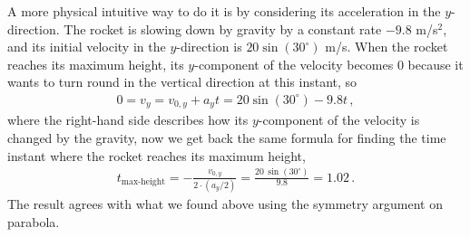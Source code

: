 \documentclass[11pt]{article}
\begin{document}
A more physical intuitive way to do it is by considering its acceleration in the $y$-direction. The rocket is slowing down by gravity by a constant rate $-9.8$ m/s$^2$, and its initial velocity in the $y$-direction is $20\sin(30^\circ)$ m/s. When the rocket reaches its maximum height, its $y$-component of the velocity becomes $0$ because it wants to turn round in the vertical direction at this instant, so
\begin{align*}
0 = v_{y} = v_{0,y} + a_yt = 20\sin(30^\circ) - 9.8 t\,,
\end{align*}  
where the right-hand side describes how its $y$-component of the velocity is changed by the gravity, now we get back the same formula for finding the time instant where the rocket reaches its maximum height,
\begin{align*}
t_{\text{max-height}} = -\frac{v_{0,y}}{2\cdot (a_y/2)} = \frac{20\,\sin(30^\circ)}{9.8} = 1.02\,.
\end{align*}
The result agrees with what we found above using the symmetry argument on parabola. 
 
\end{document}
